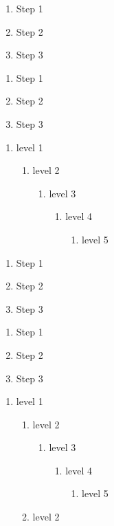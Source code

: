 \begin{enumerate}
\item Step 1
\item Step 2
\item Step 3
\end{enumerate}

\begin{enumerate}
\item Step 1
\item Step 2
\item Step 3
\end{enumerate}

\begin{enumerate}
\item level 1
\begin{enumerate}
\item level 2
\begin{enumerate}
\item level 3
\begin{enumerate}
\item level 4
\begin{enumerate}
\item level 5
\end{enumerate}
\end{enumerate}
\end{enumerate}
\end{enumerate}
\end{enumerate}

\begin{enumerate}
\item Step 1
\item Step 2
\item Step 3
\end{enumerate}

\begin{enumerate}
\item Step 1
\item Step 2
\item Step 3
\end{enumerate}

\begin{enumerate}
\item level 1
\begin{enumerate}
\item level 2
\begin{enumerate}
\item level 3
\begin{enumerate}
\item level 4
\begin{enumerate}
\item level 5
\end{enumerate}
\end{enumerate}
\end{enumerate}
\item level 2
\end{enumerate}
\end{enumerate}

